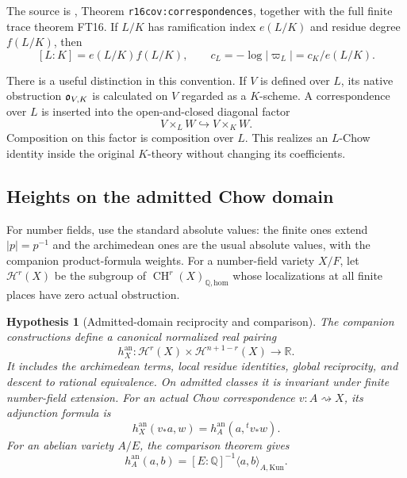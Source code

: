 \documentclass[11pt,a4paper]{article}
\newtheorem{hypothesis}[theorem]{Hypothesis}
\theoremstyle{definition}
\theoremstyle{remark}\newtheorem{remark}[theorem]{Remark}
\numberwithin{equation}{section}
\newcommand{\Q}{\mathbb Q}\newcommand{\R}{\mathbb R}\newcommand{\C}{\mathbb C}
\newcommand{\CH}{\operatorname{CH}}\newcommand{\an}{\mathrm{an}}
\newcommand{\homol}{\mathrm{hom}}\newcommand{\BC}{\mathrm{BC}}
\begin{document}
The source is \cite{InternalCovariance}, Theorem
\texttt{r16cov:correspondences}, together with the full finite trace
theorem FT16. If $L/K$ has ramification index $e(L/K)$ and residue
degree $f(L/K)$, then
\begin{equation}\label{eq:local-normalization}
 [L:K]=e(L/K)f(L/K),\qquad
 c_L=-\log|\varpi_L|=c_K/e(L/K).
\end{equation}

There is a useful distinction in this convention. If $V$ is defined
over $L$, its native obstruction $\mathfrak o_{V,K}$ is calculated on $V$
regarded as a $K$-scheme. A correspondence over $L$ is inserted into
the open-and-closed diagonal factor
\[
       V\times_L W\hookrightarrow V\times_K W.
\]
Composition on this factor is composition over $L$. This realizes an
$L$-Chow identity inside the original $K$-theory without changing its
coefficients.

\subsection{Heights on the admitted Chow domain}\label{sub:height-input}

For number fields, use the standard absolute values: the finite ones
extend $|p|=p^{-1}$ and the archimedean ones are the usual absolute
values, with the companion product-formula weights. For a
number-field variety $X/F$, let $\mathcal H^r(X)$ be the subgroup
of $\CH^r(X)_{\Q,\homol}$ whose localizations at all finite places
have zero actual obstruction.

\begin{hypothesis}[Admitted-domain reciprocity and comparison]\label{hyp:height-input}
The companion constructions \cite{InternalHeight} define a canonical normalized real pairing
\[
 h_X^{\an}:\mathcal H^r(X)\times\mathcal H^{n+1-r}(X)\longrightarrow\R.
\]
It includes the archimedean terms, local residue identities, global
reciprocity, and descent to rational equivalence. On admitted classes
it is invariant under finite number-field extension. For an actual
Chow correspondence $v:A\rightsquigarrow X$, its adjunction formula is
\begin{equation}\label{eq:height-adjunction}
       h_X^{\an}(v_*a,w)=h_A^{\an}(a,{}^tv_*w).
\end{equation}
For an abelian variety $A/E$, the comparison theorem gives
\begin{equation}\label{eq:abelian-comparison}
       h_A^{\an}(a,b)=[E:\Q]^{-1}\langle a,b\rangle_{A,\mathrm{Kun}}.
\end{equation}
\end{hypothesis}
\end{document}
